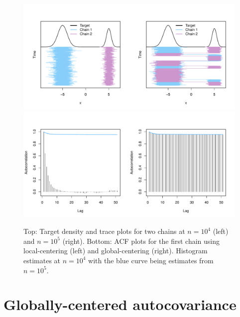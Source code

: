 \documentclass[12pt]{article}
\theoremstyle{remark}
\begin{document}
\begin{figure}[htbp]
\centering
   \includegraphics[width=.62\linewidth]{plots/gaussian-Targettrace.pdf}\\
\vspace{-.5cm}
    \includegraphics[width=.62\textwidth]{plots/gaussian-acf_hist.pdf} 
    \caption{Top: Target density and trace plots for two chains at $n = 10^4$ (left) and $n = 10^5$ (right). Bottom: ACF plots for the first chain using local-centering (left) and global-centering (right). Histogram estimates at $n = 10^4$ with the blue curve being estimates from $n = 10^5$.}
    \label{fig:gaussian-trace}
\end{figure}






\section{Globally-centered autocovariance} \label{sec:G-ACF}
\end{document}
